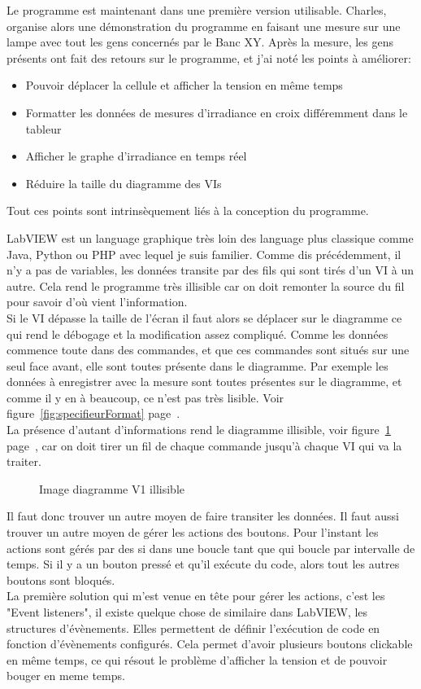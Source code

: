 \documentclass[12pt]{article}
\begin{document}
Le programme est maintenant dans une première version utilisable.
Charles, organise alors une démonstration du programme en faisant une mesure sur une lampe avec tout les gens concernés par le Banc XY.
Après la mesure, les gens présents ont fait des retours sur le programme, et j'ai noté les points à améliorer:
\begin{itemize}
	\item Pouvoir déplacer la cellule et afficher la tension en même temps
	\item Formatter les données de mesures d'irradiance en croix différemment dans le tableur
	\item Afficher le graphe d'irradiance en temps réel
	\item Réduire la taille du diagramme des VIs
\end{itemize}
Tout ces points sont intrinsèquement liés à la conception du programme.

LabVIEW est un language graphique très loin des language plus classique comme Java, Python ou PHP avec lequel je suis familier.
Comme dis précédemment, il n'y a pas de variables, les données transite par des fils qui sont tirés d'un VI à un autre.
Cela rend le programme très illisible car on doit remonter la source du fil pour savoir d'où vient l'information.\\
Si le VI dépasse la taille de l'écran il faut alors se déplacer sur le diagramme ce qui rend le débogage et la modification assez compliqué.
Comme les données commence toute dans des commandes, et que ces commandes sont situés sur une seul face avant, elle sont toutes présente dans le diagramme.
Par exemple les données à enregistrer avec la mesure sont toutes présentes sur le diagramme, et comme il y en à beaucoup, ce n'est pas très lisible.
Voir figure~\ref{fig:specifieurFormat} page~\pageref{fig:specifieurFormat}.\\
La présence d'autant d'informations rend le diagramme illisible, voir figure~\ref{fig:diagrammeV1} page~\pageref{fig:diagrammeV1}, car on doit tirer un fil de chaque commande jusqu'à chaque VI qui va la traiter.

\begin{figure}[p]
	\centering
	\caption{Image diagramme V1 illisible}
	\label{fig:diagrammeV1}
\end{figure}


Il faut donc trouver un autre moyen de faire transiter les données.
Il faut aussi trouver un autre moyen de gérer les actions des boutons.
Pour l'instant les actions sont gérés par des si dans une boucle tant que qui boucle par intervalle de temps. Si il y a un bouton pressé et qu'il exécute du code, alors tout les autres boutons sont bloqués.\\
La première solution qui m'est venue en tête pour gérer les actions, c'est les "Event listeners", il existe quelque chose de similaire dans LabVIEW, les structures d'évènements.
Elles permettent de définir l'exécution de code en fonction d'évènements configurés.
Cela permet d'avoir plusieurs boutons clickable en même temps, ce qui résout le problème d'afficher la tension et de pouvoir bouger en meme temps.
\end{document}
